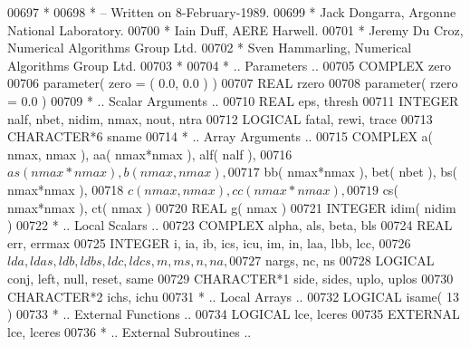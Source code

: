 \begin{DoxyCode}
00697 \textcolor{comment}{*}
00698 \textcolor{comment}{*  -- Written on 8-February-1989.}
00699 \textcolor{comment}{*     Jack Dongarra, Argonne National Laboratory.}
00700 \textcolor{comment}{*     Iain Duff, AERE Harwell.}
00701 \textcolor{comment}{*     Jeremy Du Croz, Numerical Algorithms Group Ltd.}
00702 \textcolor{comment}{*     Sven Hammarling, Numerical Algorithms Group Ltd.}
00703 \textcolor{comment}{*}
00704 \textcolor{comment}{*     .. Parameters ..}
00705       \textcolor{keywordtype}{COMPLEX}            zero
00706       parameter( zero = ( 0.0, 0.0 ) )
00707       \textcolor{keywordtype}{REAL}               rzero
00708       parameter( rzero = 0.0 )
00709 \textcolor{comment}{*     .. Scalar Arguments ..}
00710       \textcolor{keywordtype}{REAL}               eps, thresh
00711       \textcolor{keywordtype}{INTEGER}            nalf, nbet, nidim, nmax, nout, ntra
00712       \textcolor{keywordtype}{LOGICAL}            fatal, rewi, trace
00713       \textcolor{keywordtype}{CHARACTER*6}        sname
00714 \textcolor{comment}{*     .. Array Arguments ..}
00715       \textcolor{keywordtype}{COMPLEX}            a( nmax, nmax ), aa( nmax*nmax ), alf( nalf ),
00716      $                   as( nmax*nmax ), b( nmax, nmax ),
00717      $                   bb( nmax*nmax ), bet( nbet ), bs( nmax*nmax ),
00718      $                   c( nmax, nmax ), cc( nmax*nmax ),
00719      $                   cs( nmax*nmax ), ct( nmax )
00720       \textcolor{keywordtype}{REAL}               g( nmax )
00721       \textcolor{keywordtype}{INTEGER}            idim( nidim )
00722 \textcolor{comment}{*     .. Local Scalars ..}
00723       \textcolor{keywordtype}{COMPLEX}            alpha, als, beta, bls
00724       \textcolor{keywordtype}{REAL}               err, errmax
00725       \textcolor{keywordtype}{INTEGER}            i, ia, ib, ics, icu, im, in, laa, lbb, lcc,
00726      $                   lda, ldas, ldb, ldbs, ldc, ldcs, m, ms, n, na,
00727      $                   nargs, nc, ns
00728       \textcolor{keywordtype}{LOGICAL}            conj, left, null, reset, same
00729       \textcolor{keywordtype}{CHARACTER*1}        side, sides, uplo, uplos
00730       \textcolor{keywordtype}{CHARACTER*2}        ichs, ichu
00731 \textcolor{comment}{*     .. Local Arrays ..}
00732       \textcolor{keywordtype}{LOGICAL}            isame( 13 )
00733 \textcolor{comment}{*     .. External Functions ..}
00734       \textcolor{keywordtype}{LOGICAL}            lce, lceres
00735       \textcolor{keywordtype}{EXTERNAL}           lce, lceres
00736 \textcolor{comment}{*     .. External Subroutines ..}

\end{DoxyCode}
